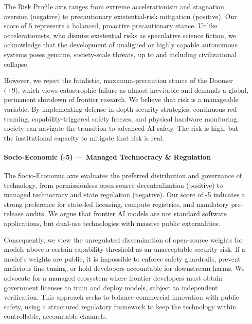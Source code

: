 The Risk Profile axis ranges from extreme accelerationism and stagnation
aversion (negative) to precautionary existential-risk mitigation
(positive). Our score of 5 represents a balanced, proactive
precautionary stance. Unlike accelerationists, who dismiss existential
risks as speculative science fiction, we acknowledge that the
development of unaligned or highly capable autonomous systems poses
genuine, society-scale threats, up to and including civilizational
collapse.

However, we reject the fatalistic, maximum-precaution stance of the
Doomer (+9), which views catastrophic failure as almost inevitable and
demands a global, permanent shutdown of frontier research. We believe
that risk is a manageable variable. By implementing defense-in-depth
security strategies, continuous red-teaming, capability-triggered safety
freezes, and physical hardware monitoring, society can navigate the
transition to advanced AI safely. The risk is high, but the
institutional capacity to mitigate that risk is real.

\paragraph{Socio-Economic (-5) --- Managed Technocracy \&
Regulation}\label{socio-economic--5-managed-technocracy-regulation}

The Socio-Economic axis evaluates the preferred distribution and
governance of technology, from permissionless open-source
decentralization (positive) to managed technocracy and state regulation
(negative). Our score of -5 indicates a strong preference for state-led
licensing, compute registries, and mandatory pre-release audits. We
argue that frontier AI models are not standard software applications,
but dual-use technologies with massive public externalities.

Consequently, we view the unregulated dissemination of open-source
weights for models above a certain capability threshold as an
unacceptable security risk. If a model's weights are public, it is
impossible to enforce safety guardrails, prevent malicious fine-tuning,
or hold developers accountable for downstream harms. We advocate for a
managed ecosystem where frontier developers must obtain government
licenses to train and deploy models, subject to independent
verification. This approach seeks to balance commercial innovation with
public safety, using a structured regulatory framework to keep the
technology within controllable, accountable channels.

